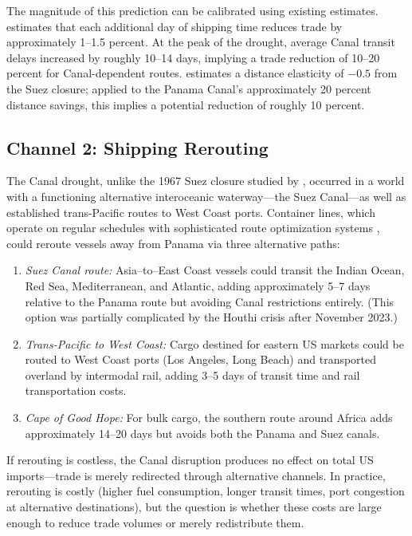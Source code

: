 \documentclass[12pt]{article}
\begin{document}
The magnitude of this prediction can be calibrated using existing estimates. \citet{hummels2007transportation} estimates that each additional day of shipping time reduces trade by approximately 1--1.5 percent. At the peak of the drought, average Canal transit delays increased by roughly 10--14 days, implying a trade reduction of 10--20 percent for Canal-dependent routes. \citet{feyrer2021distance} estimates a distance elasticity of $-0.5$ from the Suez closure; applied to the Panama Canal's approximately 20 percent distance savings, this implies a potential reduction of roughly 10 percent.

\subsection{Channel 2: Shipping Rerouting}

The Canal drought, unlike the 1967 Suez closure studied by \citet{feyrer2021distance}, occurred in a world with a functioning alternative interoceanic waterway---the Suez Canal---as well as established trans-Pacific routes to West Coast ports. Container lines, which operate on regular schedules with sophisticated route optimization systems \citep{brancaccio2020geography}, could reroute vessels away from Panama via three alternative paths:

\begin{enumerate}
    \item \textit{Suez Canal route:} Asia--to--East Coast vessels could transit the Indian Ocean, Red Sea, Mediterranean, and Atlantic, adding approximately 5--7 days relative to the Panama route but avoiding Canal restrictions entirely. (This option was partially complicated by the Houthi crisis after November 2023.)
    \item \textit{Trans-Pacific to West Coast:} Cargo destined for eastern US markets could be routed to West Coast ports (Los Angeles, Long Beach) and transported overland by intermodal rail, adding 3--5 days of transit time and rail transportation costs.
    \item \textit{Cape of Good Hope:} For bulk cargo, the southern route around Africa adds approximately 14--20 days but avoids both the Panama and Suez canals.
\end{enumerate}

If rerouting is costless, the Canal disruption produces no effect on total US imports---trade is merely redirected through alternative channels. In practice, rerouting is costly (higher fuel consumption, longer transit times, port congestion at alternative destinations), but the question is whether these costs are large enough to reduce trade volumes or merely redistribute them.
\end{document}
